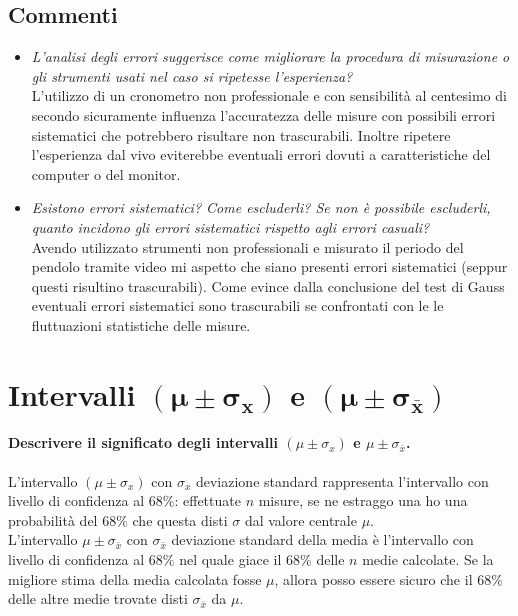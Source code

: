 \documentclass{article}
\begin{document}
	\subsection{Commenti}
	\begin{itemize}
		\item \textit{L'analisi degli errori suggerisce come migliorare la procedura di misurazione o gli strumenti usati nel caso si ripetesse l'esperienza?} \\
		
		\noindent
		L'utilizzo di un cronometro non professionale e con sensibilità al centesimo di secondo sicuramente influenza l'accuratezza delle misure con possibili errori sistematici che potrebbero risultare non trascurabili. Inoltre ripetere l'esperienza dal vivo eviterebbe eventuali errori dovuti a caratteristiche del computer o del monitor.
		
		\item \textit{Esistono errori sistematici? Come escluderli? Se non è possibile escluderli, quanto incidono gli errori sistematici rispetto agli errori casuali?} \\
		
		\noindent
		Avendo utilizzato strumenti non professionali e misurato il periodo del pendolo tramite video mi aspetto che siano presenti errori sistematici (seppur questi risultino trascurabili). Come evince dalla conclusione del test di Gauss eventuali errori sistematici sono trascurabili se confrontati con le le fluttuazioni statistiche delle misure.
	\end{itemize}
	

	\section{Intervalli $\mathbf{(\mu \pm \sigma_x)}$ e $\mathbf{(\mu \pm \sigma_{\bar{x}})}$}
	\paragraph{Descrivere il significato degli intervalli $(\mu \pm \sigma_x)$ e $\mu \pm \sigma_{\bar{x}}$.}  
	L'intervallo $(\mu \pm \sigma_x)$ con $\sigma_x$ deviazione standard rappresenta l'intervallo con livello di confidenza al $68\%$: effettuate $n$ misure, se ne estraggo una ho una probabilità del $68\%$ che questa disti $\sigma$ dal valore centrale $\mu$.  \\
	
	\noindent
	L'intervallo $\mu \pm \sigma_{\bar{x}}$ con $\sigma_{\bar{x}}$ deviazione standard della media è l'intervallo con livello di confidenza al $68\%$ nel quale giace il $68\%$ delle $n$ medie calcolate. Se la migliore stima della media calcolata fosse $\mu$, allora posso essere sicuro che il $68\%$ delle altre medie trovate disti $\sigma_{\bar{x}}$ da $\mu$. \\ \\
	
\end{document}
